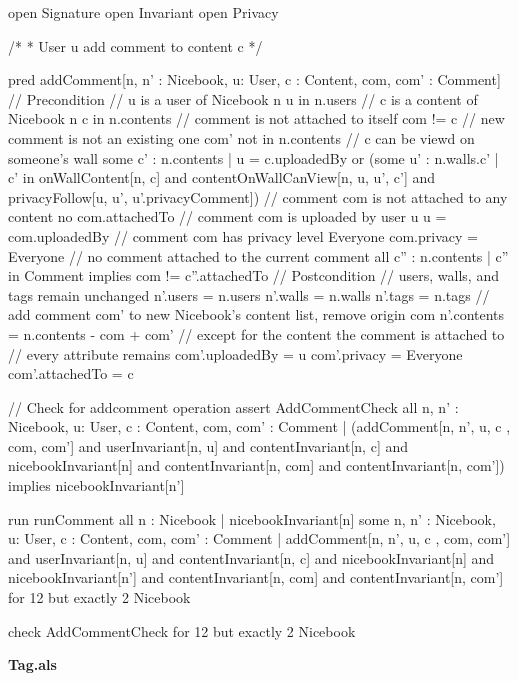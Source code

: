\documentclass[titlepage]{article}
\begin{document}
\begin{alloy}
open Signature
open Invariant
open Privacy

/*
*	User u add comment to content c
*/

pred addComment[n, n' : Nicebook, u: User, c : Content, com, com' : Comment] {
    // Precondition
    // u is a user of Nicebook n
    u in n.users
    // c is a content of Nicebook n
    c in n.contents
    // comment is not attached to itself
    com != c
    // new comment is not an existing one
    com' not in n.contents
    // c can be viewd on someone's wall
    some c' : n.contents | u = c.uploadedBy or 
        (some u' : n.walls.c' | c' in onWallContent[n, c] and 
        contentOnWallCanView[n, u, u', c'] and
        privacyFollow[u, u', u'.privacyComment])
    // comment com is not attached to any content
    no com.attachedTo
    // comment com is uploaded by user u
    u = com.uploadedBy
    // comment com has privacy level Everyone
    com.privacy = Everyone
    // no comment attached to the current comment
    all c'' : n.contents | c'' in Comment implies com != c''.attachedTo
    // Postcondition
    // users, walls, and tags remain unchanged
    n'.users = n.users
    n'.walls = n.walls
    n'.tags = n.tags
    // add comment com' to new Nicebook's content list, remove origin com
    n'.contents = n.contents - com + com'
    // except for the content the comment is attached to
    // every attribute remains
    com'.uploadedBy = u
    com'.privacy = Everyone
    com'.attachedTo = c
}

// Check for addcomment operation
assert AddCommentCheck {
    all n, n' : Nicebook, u: User, c : Content, com, com' : Comment | 
        (addComment[n, n', u, c , com, com'] and userInvariant[n, u] and 
        contentInvariant[n, c] and nicebookInvariant[n] and 
        contentInvariant[n, com] and contentInvariant[n, com']) implies 
            nicebookInvariant[n']
}

run runComment {
    all n : Nicebook | nicebookInvariant[n]
    some n, n' : Nicebook, u: User, c : Content, com, com' : Comment | 
        addComment[n, n', u, c , com, com'] and userInvariant[n, u] and 
        contentInvariant[n, c] and nicebookInvariant[n] and nicebookInvariant[n'] and
            contentInvariant[n, com] and contentInvariant[n, com']
} for 12 but exactly 2 Nicebook

check AddCommentCheck for 12 but exactly 2 Nicebook   
\end{alloy}
{\bf\large Tag.als}
\end{document}
